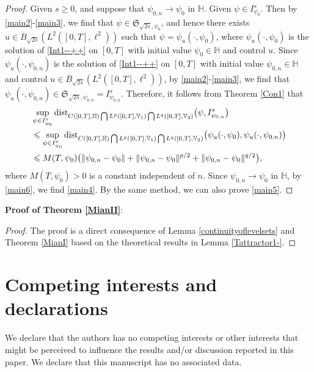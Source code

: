 \documentclass[11pt]{article}
\newcommand{\dist}{{\rm dist}}
\renewcommand{\leq}{\leqslant}
\renewcommand{\geq}{\geqslant}  %
\numberwithin{equation}{section}
\begin{document}
\begin{proof}
Given $s\geq0$, and suppose that $\psi_{0,n}\rightarrow\psi_{0}$
in $\mathbb{H}$. Given $\psi\in I^s_{\psi_{0}}$.  Then by \eqref{main2}-\eqref{main3}, we find that $\psi\in\mathfrak{S}_{\sqrt{2s},\psi_{0}}$, and hence there exists
$u\in\overline{B}_{\sqrt{2s}}(L^2([0,T],\ell^2 ))$ such that $\psi=\psi_u(\cdot,\psi_0)$, where $\psi_u(\cdot,\psi_0)$ is the solution of \eqref{Int1--++}
on $[0,T]$ with initial value $\psi_0\in \mathbb{H}$ and control $u$.
Since $\psi_u(\cdot,\psi_{0,n})$ is the solution of \eqref{Int1--++}
on $[0,T]$ with initial value $\psi_{0,n}\in \mathbb{H}$ and control $u\in\overline{B}_{\sqrt{2s}}(L^2([0,T],\ell^2 ))$,
by \eqref{main2}-\eqref{main3}, we find that $\psi_u(\cdot,\psi_{0,n})\in \mathfrak{S}_{\sqrt{2s},\psi_{0,n}}
=I^{s}_{\psi_{0,n}}$. Therefore, it follows
from Theorem \ref{Con1} that
\begin{align}&\label{main6}
\sup_{\psi\in I^s_{\psi_{0}}}\dist_{C([0,T],\mathbb{H} )\bigcap L^p([0,T], \mathbb{V}_1  )\bigcap L^q([0,T], \mathbb{V}_2)}\big(\psi,I^s_{\psi_{0,n}}\big)
\nonumber\\&\leq\sup_{\psi\in I^s_{\psi_{0}}}\dist_{C([0,T],\mathbb{H} )\bigcap L^p([0,T], \mathbb{V}_1  )\bigcap L^q([0,T], \mathbb{V}_2)}\big(\psi_u(\cdot,\psi_0),
\psi_u(\cdot,\psi_{0,n})\big)
\nonumber\\&\leq M(T,\psi_{0})\big(\|\psi_{0,n}-\psi_{0}\|
+\|\psi_{0,n}-\psi_{0}\|^{p/2}
+\|\psi_{0,n}-\psi_{0}\|^{q/2}\big),
\end{align}
where $M(T,\psi_{0})>0$ is a constant independent of $n$. Since $\psi_{0,n}\rightarrow\psi_{0}$
in $\mathbb{H}$, by \eqref{main6}, we
find \eqref{main4}. By the same method, we can also prove \eqref{main5}.
\end{proof}




\textbf{Proof of Theorem \ref{MianII}}:


\begin{proof}
The proof is a direct consequence of Lemma \ref{continuityoflevelsets} and Theorem \ref{MianI} based on the theoretical results in Lemma \ref{Tattractor1-}.
\end{proof}

\section*{
Competing interests and declarations}
We declare that the authors has no competing interests or other interests that might be perceived to influence the results and/or discussion reported in this paper. We declare that
this manuscript has no associated data.
\end{document}
